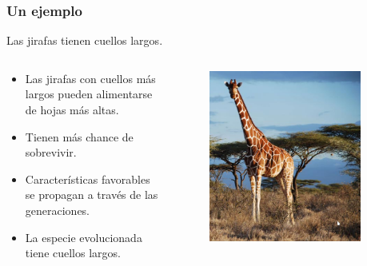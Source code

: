 \documentclass[10pt]{beamer}
\begin{document}
\begin{frame}
  \frametitle{Un ejemplo}
  Las jirafas tienen cuellos largos.
  \begin{columns}
    \begin{column}{0.6\textwidth}
      \begin{itemize}
        \item Las jirafas con cuellos más largos pueden alimentarse de hojas más altas.
        \item Tienen más chance de sobrevivir.
        \item Características favorables se propagan a través de las generaciones.
        \item La especie evolucionada tiene cuellos largos.
      \end{itemize}
    \end{column}
    \begin{column}{0.4\textwidth}
      \begin{figure}[!h] 
        \centering
        \includegraphics[width=0.9\textwidth]{img/jirafa}
      \end{figure}  
    \end{column}
  \end{columns}
\end{frame}
\end{document}
